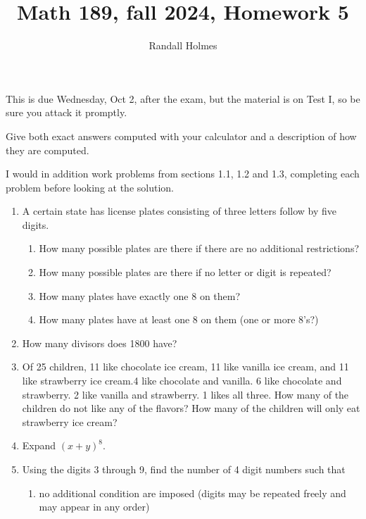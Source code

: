 \documentclass[12pt]{article}
\title{Math 189, fall 2024, Homework 5}
\author{Randall Holmes}
\begin{document}
\maketitle

This is due Wednesday, Oct 2, after the exam, but the material is on Test I, so be sure you attack it promptly.

Give both exact answers computed with your calculator and a description of how they are computed.

I would in addition work problems from sections 1.1, 1.2 and 1.3, completing each problem before looking at the solution.

\begin{enumerate}

\item  A certain state has license plates consisting of three letters follow by five digits.

\begin{enumerate}

\item How many possible plates are there if there are no additional restrictions?

\item  How many possible plates are there if no letter or digit is repeated?

\item  How many plates have exactly one 8 on them? 

\item  How many plates have at least one 8 on them (one or more 8's?)

\end{enumerate}

\item  How many divisors does 1800 have?

\item Of 25 children, 11 like chocolate ice cream, 11 like vanilla ice cream, and 11 like strawberry ice cream.4 like chocolate and vanilla.  6 like chocolate and strawberry.  2 like vanilla and strawberry.  1 likes all three.   How many of the children do not like any of the flavors?  How many of the children will only eat strawberry ice cream?

\item  Expand $(x+y)^8$.

\item  Using the digits 3 through 9, find the number of 4 digit numbers such that

\begin{enumerate}
\item no additional condition are imposed (digits may be repeated freely and may appear in any order)


\end{enumerate}
\end{enumerate}
\end{document}
